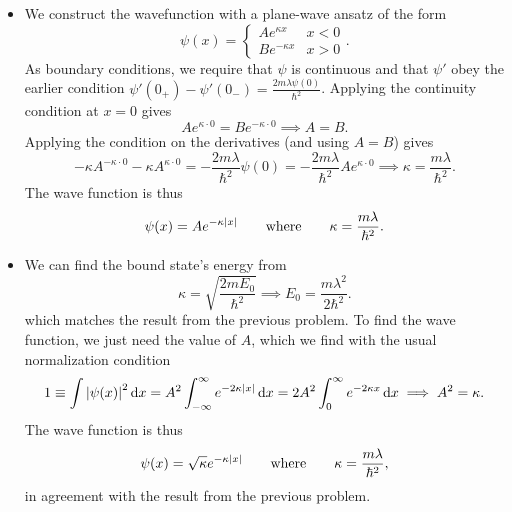 \documentclass[11pt, a4paper]{article}
\newcommand{\diff}{\mathop{}\!\mathrm{d}} %
\newcommand{\eqtext}[1]{\qquad \text{#1} \qquad}
\begin{document}
\begin{itemize}
	
	\item We construct the wavefunction with a plane-wave ansatz of the form
	\begin{equation*}
		\psi(x) =
		\begin{cases}
			A e^{\kappa x} & x < 0\\
			B e^{-\kappa x} & x > 0
		\end{cases}.
	\end{equation*}
	As boundary conditions, we require that $ \psi $ is continuous and that $ \psi' $ obey the earlier condition $ \psi'(0_{+}) - \psi'(0_{-}) = \frac{2m\lambda\psi(0)}{\hbar^{2}} $. Applying the continuity condition at $ x = 0 $ gives
	\begin{equation*}
		A e^{\kappa \cdot 0} = B e^{-\kappa \cdot 0} \implies A = B.
	\end{equation*}
	Applying the condition on the derivatives (and using $ A = B $) gives
	\begin{equation*}
		-\kappa A^{-\kappa \cdot 0} -\kappa A^{\kappa \cdot 0} = -\frac{2m\lambda}{\hbar^{2}} \psi(0) = - \frac{2m\lambda }{\hbar^{2}} Ae^{\kappa \cdot  0} \implies \kappa = \frac{m\lambda}{\hbar^{2}}.
	\end{equation*}
	The wave function is thus
	\begin{equation*}
		\psi(x) = A e^{-\kappa \abs{x}} \eqtext{where} \kappa = \frac{m\lambda}{\hbar^{2}}.
	\end{equation*}

	\item We can find the bound state's energy from
	\begin{equation*}
		\kappa = \sqrt{\frac{2mE_{0}}{\hbar^{2}}} \implies E_{0} = \frac{m\lambda^{2}}{2\hbar^{2}}.
	\end{equation*}
	which matches the result from the previous problem. To find the wave function, we just need the value of $ A $, which we find with the usual normalization condition
	\begin{equation*}
		1 \equiv \int \abs{\psi(x)}^{2} \diff x = A^{2} \int_{-\infty}^{\infty} e^{-2\kappa \abs{x}} \diff x = 2A^{2} \int_{0}^{\infty} e^{-2\kappa x} \diff x \implies A^{2} = \kappa.
	\end{equation*}
	The wave function is thus
	\begin{equation*}
		\psi(x) = \sqrt{\kappa} e^{-\kappa \abs{x}} \eqtext{where} \kappa = \frac{m\lambda}{\hbar^{2}},
	\end{equation*}
	in agreement with the result from the previous problem. 
	 
\end{itemize}
\end{document}

